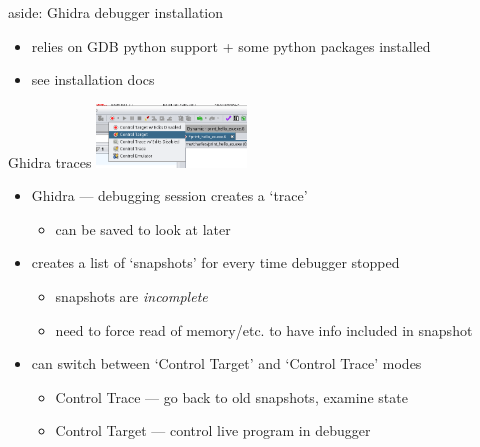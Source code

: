 \begin{frame}{aside: Ghidra debugger installation}
    \begin{itemize}
    \item relies on GDB python support + some python packages installed
    \item see installation docs
    \end{itemize}
\end{frame}

\begin{frame}{Ghidra traces}
\includegraphics[width=0.3\textwidth]{../re-tools/ghidra-control-target.png}
    \begin{itemize}
    \item Ghidra --- debugging session creates a `trace'
        \begin{itemize}
        \item can be saved to look at later
        \end{itemize}
    \item creates a list of `snapshots' for every time debugger stopped
        \begin{itemize}
        \item snapshots are \textit{incomplete}
        \item need to force read of memory/etc. to have info included in snapshot
        \end{itemize}
    \item can switch between `Control Target' and `Control Trace' modes
        \begin{itemize}
        \item Control Trace --- go back to old snapshots, examine state
        \item Control Target --- control live program in debugger
        \end{itemize}
    \end{itemize}
\end{frame}

